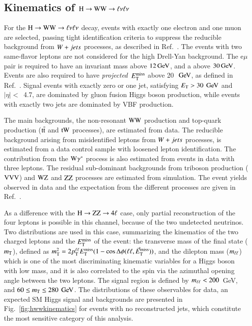 \subsection{Kinematics of $\mathrm{H}\to\mathrm{W}\mathrm{W}\to\ell\nu\ell\nu$}
\label{sec:hwwkinematics}

For the $\mathrm{H}\to\mathrm{W}\mathrm{W}\to\ell\nu\ell\nu$ decay, events with exactly one electron and one
muon are selected, passing tight identification criteria to suppress
the reducible background from $W+jets$ processes, as described in
Ref.~\cite{Chatrchyan:2013iaa}.  The events with two same-flavor
leptons are not considered for the high Drell-Yan background.  The
$\mathrm{e}\mu$ pair is required to have an invariant mass above
$12\,\mathrm{Ge\hspace{-.08em}V}$, and a \pt above $30\,\mathrm{Ge\hspace{-.08em}V}$. Events are also required to have
\textit{projected}~$E_{\mathrm{T}}^{\mathrm{miss}}$ above 20~$\,\mathrm{Ge\hspace{-.08em}V}$, as defined in
Ref.~\cite{Chatrchyan:2013iaa}. Signal events with exactly zero or one
jet, satisfying $E_{\mathrm{T}}>30~\,\mathrm{Ge\hspace{-.08em}V}$ and $|\eta|<$~4.7, are dominated by
gluon fusion Higgs boson production, while events with exactly two
jets are dominated by VBF production.

The main backgrounds, the non-resonant $\mathrm{W}\mathrm{W}$ production and
top-quark production ($\mathrm{t}\overline{\mathrm{t}}$ and $\mathrm{t}\mathrm{W}$ processes), are estimated
from data.  The reducible background arising from misidentified
leptons from $W+jets$ processes, is estimated from a data control
sample with loosened lepton identification. The contribution from the
$\mathrm{W}\gamma^*$ process is also estimated from events in data with three
leptons. The residual sub-dominant backgrounds from triboson
production ($\mathrm{V}\mathrm{V}\mathrm{V}$) and $\mathrm{W}\mathrm{Z}$ and $\mathrm{Z}\mathrm{Z}$ processes are
estimated from simulation.
%
The event yields observed in data and the expectation from 
the different processes are given in Ref.~\cite{Chatrchyan:2013iaa}.

As a difference with the $\mathrm{H}\to\mathrm{Z}\mathrm{Z}\to4\ell$ case, only partial reconstruction
of the four leptons is possible in this channel, because of the two
undetected neutrinos. Two distributions are used in this case,
summarizing the kinematics of the two charged leptons and the $E_{\mathrm{T}}^{\mathrm{miss}}$
of the event: the transverse mass of the final state ($m_{\mathrm{T}}$), defined
as $m_{\mathrm{T}}^2 = 2 p_{\mathrm{T}}^{\ell\ell} E_{\mathrm{T}}^{\mathrm{miss}} (1-\cos\Delta\phi(\ell\ell,\vec{E}_\mathrm{T}^{\mathrm{miss}}))$, and the dilepton mass
($m_{\ell\ell}$) which is one of the most discriminating kinematic variables
for a Higgs boson with low mass, and it is also correlated to the spin
via the azimuthal opening angle between the two leptons.
%
The signal region is defined by $m_{\ell\ell} < 200$~GeV, and $60 \leq m_{\mathrm{T}}
\leq 280~\,\mathrm{Ge\hspace{-.08em}V}$.  The distributions of these observables for data, an
expected SM Higgs signal and backgrounds are presented in
Fig.~\ref{fig:hwwkinematics} for events with no reconstructed jets,
which constitute the most sensitive category of this analysis.
%

